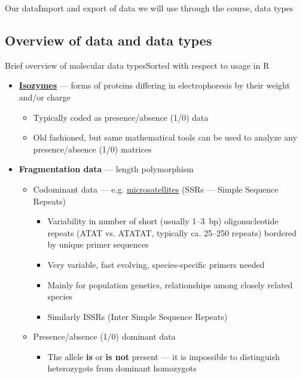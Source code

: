 \documentclass[compress, ucs, xelatex, 11pt, xcolor=svgnames,
	hyperref={
		bookmarks=true,
		unicode=true,
		colorlinks=true,
		pdftitle={Molecular data in R},
		plainpages=false,
		pdfauthor={Vojtech Zeisek},
		pdfsubject={Course about phylogeny and evolution in R},
		pdfcreator={XeLaTeX},
		pdfkeywords={R, evolution, phylogeny, molecular data},
		linkcolor=Tomato,
		anchorcolor=SaddleBrown,
		citecolor=Goldenrod,
		filecolor=DarkMagenta,
		menucolor=Sienna,
		urlcolor=DarkTurquoise,
		pdftex},
	url={hyphens, lowtilde} %
	]{beamer}
\begin{document}
\begin{frame}{Our data}{Import and export of data we will use through the course, data types}
	\tableofcontents[currentsection, sectionstyle=show/hide, hideothersubsections]
\end{frame}

\subsection[Overview]{Overview of data and data types}

\begin{frame}[allowframebreaks]{Brief overview of molecular data types}{Sorted with respect to usage in R}
	\begin{itemize}
		\item \textbf{\href{https://en.wikipedia.org/wiki/Isozyme}{Isozymes}} --- forms of proteins differing in electrophoresis by their weight and/or charge
		\begin{itemize}
			\item Typically coded as presence/absence (1/0) data
			\item Old fashioned, but same mathematical tools can be used to analyze any presence/absence (1/0) matrices
		\end{itemize}
		\item \textbf{Fragmentation data} --- length polymorphism
		\begin{itemize}
			\item Codominant data --- e.g. \href{https://en.wikipedia.org/wiki/Microsatellite}{microsatellites} (SSRs --- Simple Sequence Repeats)
			\begin{itemize}
				\item Variability in number of short (usually 1--3~bp) oligonucleotide repeats (ATAT vs. ATATAT, typically ca. 25--250 repeats) bordered by unique primer sequences
				\item Very variable, fast evolving, species-specific primers needed
				\item Mainly for population genetics, relationships among closely related species
				\item Similarly ISSRs (Inter Simple Sequence Repeats)
			\end{itemize}
			\item Presence/absence (1/0) dominant data
			\begin{itemize}
				\item The allele \textbf{is} or \textbf{is not} present  --- it is impossible to distinguish heterozygots from dominant homozygots

\end{itemize}
\end{itemize}
\end{itemize}
\end{frame}
\end{document}
